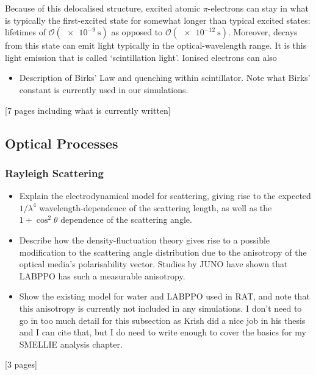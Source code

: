 \begin{figure}
    \centering
    \caption[]{}
    \label{fig:benzene_pi_bonds}
\end{figure}

Because of this delocalised structure, excited atomic $\pi$-electrons can stay in what is typically the first-excited state for somewhat longer than typical excited states: lifetimes of $\mathcal{O}(\SI{e-9}{\second})$ as opposed to $\mathcal{O}(\SI{e-12}{\second})$. Moreover, decays from this state can emit light typically in the optical-wavelength range. It is this light emission that is called `scintillation light'. Ionised electrons can also 

{
    \color{blue}

    \begin{itemize}
        \item Description of Birks' Law and quenching within scintillator. Note what Birks' constant is currently used in our simulations.
    \end{itemize}
[7 pages including what is currently written]
    \subsection{Optical Processes}
    \subsubsection{Rayleigh Scattering}
    \begin{itemize}
        \item Explain the electrodynamical model for scattering, giving rise to the expected $1/\lambda^4$ wavelength-dependence of the scattering length, as well as the $1+\cos^2\theta$ dependence of the scattering angle.
        \item Describe how the density-fluctuation theory gives rise to a possible modification to the scattering angle distribution due to the anisotropy of the optical media's polarisability vector. Studies by JUNO have shown that LABPPO has such a measurable anisotropy.
        \item Show the existing model for water and LABPPO used in RAT, and note that this anisotropy is currently not included in any simulations. I don't need to go in too much detail for this subsection as Krish did a nice job in his thesis and I can cite that, but I do need to write enough to cover the basics for my SMELLIE analysis chapter.
    \end{itemize}
    [3 pages]
}
